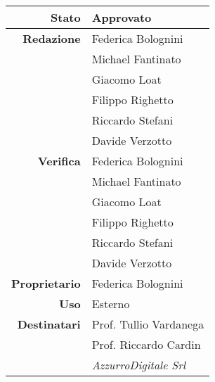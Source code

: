 \thispagestyle{empty} %

\begin{center}
\begin{tabular}{r|l}
    \textbf{Stato} & Approvato \\
    \hline
    \textbf{Redazione} & Federica Bolognini \\
                       & Michael Fantinato \\
                       & Giacomo Loat \\
                       & Filippo Righetto \\
                       & Riccardo Stefani \\
                       & Davide Verzotto \\
    \hline
    \textbf{Verifica} & Federica Bolognini \\
                      & Michael Fantinato \\
                      & Giacomo Loat \\
                      & Filippo Righetto \\
                      & Riccardo Stefani \\
                      & Davide Verzotto \\
    \hline
    \textbf{Proprietario} & Federica Bolognini \\
    \hline
    \textbf{Uso} & Esterno \\
    \hline
    \textbf{Destinatari} & Prof. Tullio Vardanega \\
                         & Prof. Riccardo Cardin \\
                         & \emph{AzzurroDigitale Srl} \\
\end{tabular}
\end{center}
    
